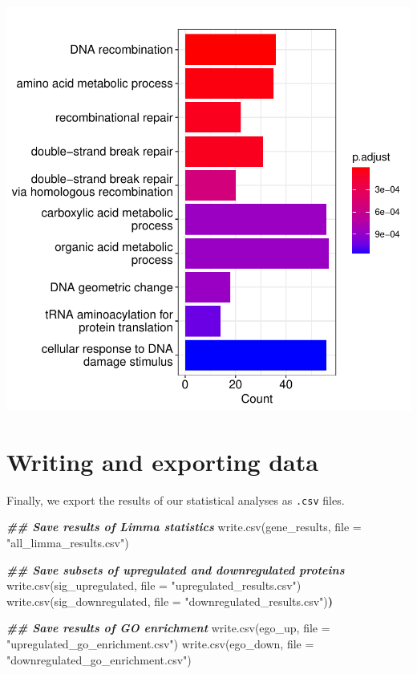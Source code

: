 \documentclass[9pt,a4paper,]{extarticle}
\newenvironment{Shaded}{\begin{snugshade}}{\end{snugshade}}
\newcommand{\AttributeTok}[1]{\textcolor[rgb]{0.77,0.63,0.00}{#1}}
\newcommand{\DocumentationTok}[1]{\textcolor[rgb]{0.56,0.35,0.01}{\textbf{\textit{#1}}}}
\newcommand{\ErrorTok}[1]{\textcolor[rgb]{0.64,0.00,0.00}{\textbf{#1}}}
\newcommand{\FunctionTok}[1]{\textcolor[rgb]{0.00,0.00,0.00}{#1}}
\newcommand{\NormalTok}[1]{#1}
\newcommand{\StringTok}[1]{\textcolor[rgb]{0.31,0.60,0.02}{#1}}
\begin{document}
\begin{center}\includegraphics[height=0.4\textheight]{workflow_expressions_files/figure-latex/GO_enrichment_plot-1} \end{center}

\hypertarget{writing-and-exporting-data}{%
\section{Writing and exporting data}\label{writing-and-exporting-data}}

Finally, we export the results of our statistical analyses as \texttt{.csv} files.

\begin{Shaded}
\begin{Highlighting}[]
\DocumentationTok{\#\# Save results of Limma statistics}
\FunctionTok{write.csv}\NormalTok{(gene\_results, }\AttributeTok{file =} \StringTok{"all\_limma\_results.csv"}\NormalTok{)}

\DocumentationTok{\#\# Save subsets of upregulated and downregulated proteins}
\FunctionTok{write.csv}\NormalTok{(sig\_upregulated, }\AttributeTok{file =} \StringTok{"upregulated\_results.csv"}\NormalTok{)}
\FunctionTok{write.csv}\NormalTok{(sig\_downregulated, }\AttributeTok{file =} \StringTok{"downregulated\_results.csv"}\NormalTok{)}\ErrorTok{)}

\DocumentationTok{\#\# Save results of GO enrichment}
\FunctionTok{write.csv}\NormalTok{(ego\_up, }\AttributeTok{file =} \StringTok{"upregulated\_go\_enrichment.csv"}\NormalTok{)}
\FunctionTok{write.csv}\NormalTok{(ego\_down, }\AttributeTok{file =} \StringTok{"downregulated\_go\_enrichment.csv"}\NormalTok{)}
\end{Highlighting}
\end{Shaded}
\end{document}
